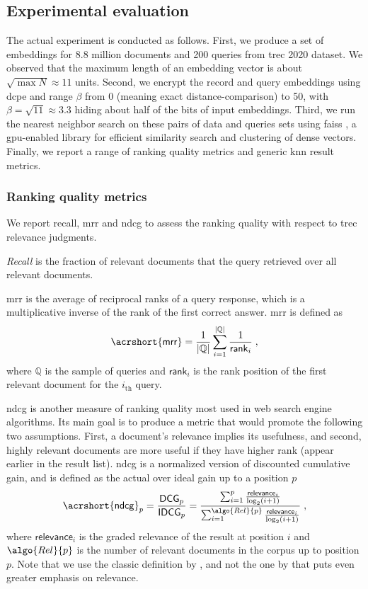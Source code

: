 		\subsection{Experimental evaluation}

			The actual experiment is conducted as follows.
			First, we produce a set of embeddings for 8.8 million documents and 200 queries from \acrshort{trec} 2020 dataset.
			We observed that the maximum length of an embedding vector is about $\sqrt{\max N} \approx 11$ units.
			Second, we encrypt the record and query embeddings using \acrshort{dcpe} and range $\beta$ from 0 (meaning exact distance-comparison) to 50, with $\beta = \sqrt{11} \approx 3.3$ hiding about half of the bits of input embeddings.
			Third, we run the nearest neighbor search on these pairs of data and queries sets using \acrshort{faiss} \cite{faiss}, a \acrshort{gpu}-enabled library for efficient similarity search and clustering of dense vectors.
			Finally, we report a range of ranking quality metrics and generic \acrshort{knn} result metrics.

			\subsubsection{Ranking quality metrics}

				We report recall, \acrfull{mrr} \cite{mrr} and \acrfull{ndcg} \cite{dcg} to assess the ranking quality with respect to \acrshort{trec} relevance judgments.

				\emph{Recall} is the fraction of relevant documents that the query retrieved over all relevant documents.

				\acrfull{mrr} is the average of reciprocal ranks of a query response, which is a multiplicative inverse of the rank of the first correct answer.
				\acrshort{mrr} is defined as
				\[
					\mathsf{\acrshort{mrr}} = \frac{1}{| \mathbb{Q} |} \sum_{i = 1}^{| \mathbb{Q} |} \frac{1}{\mathsf{rank}_i} \; ,
				\]
				where $\mathbb{Q}$ is the sample of queries and $\mathsf{rank}_i$ is the rank position of the first relevant document for the $i_\text{th}$ query.

				\acrfull{ndcg} is another measure of ranking quality most used in web search engine algorithms.
				Its main goal is to produce a metric that would promote the following two assumptions.
				First, a document's relevance implies its usefulness, and second, highly relevant documents are more useful if they have higher rank (appear earlier in the result list).
				\acrshort{ndcg} is a normalized version of discounted cumulative gain, and is defined as the actual over ideal gain up to a position $p$
				\[
					\mathsf{\acrshort{ndcg}}_p = \frac{\mathsf{DCG}_p}{\mathsf{IDCG}_p} = \frac{ \sum_{i=1}^p \frac{ \mathsf{relevance}_i }{ \log_2 (i + 1) } }{ \sum_{i=1}^{ \algo{Rel}{p} } \frac{ \mathsf{relevance}_i }{ \log_2 (i + 1) } } \; ,
				\]
				where $\mathsf{relevance}_i$ is the graded relevance of the result at position $i$ and $\algo{Rel}{p}$ is the number of relevant documents in the corpus up to position $p$.
				Note that we use the classic definition by \textcite{dcg}, and not the one by \textcite{dcg-updated} that puts even greater emphasis on relevance.

